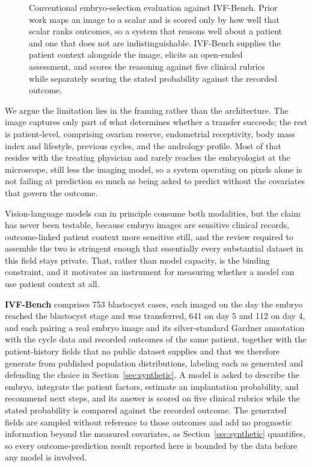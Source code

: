 \documentclass[11pt]{article}
\begin{document}
\begin{figure}[H]
\caption{Conventional embryo-selection evaluation against IVF-Bench. Prior work
maps an image to a scalar and is scored only by how well that scalar ranks
outcomes, so a system that reasons well about a patient and one that does not are
indistinguishable. IVF-Bench supplies the patient context alongside the image,
elicits an open-ended assessment, and scores the reasoning against five clinical
rubrics while separately scoring the stated probability against the recorded
outcome.}
\label{fig:pipeline}
\end{figure}


We argue the limitation lies in the framing rather than the architecture. The
image captures only part of what determines whether a transfer succeeds; the rest
is patient-level, comprising ovarian reserve, endometrial receptivity, body mass
index and lifestyle, previous cycles, and the andrology profile. Most of that
resides with the treating physician and rarely reaches the embryologist at the
microscope, still less the imaging model, so a system operating on pixels alone
is not failing at prediction so much as being asked to predict without the
covariates that govern the outcome.

Vision-language models can in principle consume both modalities, but the claim
has never been testable, because embryo images are sensitive clinical records,
outcome-linked patient context more sensitive still, and the review required to
assemble the two is stringent enough that essentially every substantial dataset
in this field stays private. That, rather than model capacity, is the binding
constraint, and it motivates an instrument for measuring whether a model can use
patient context at all.

\textbf{IVF-Bench} comprises 753 blastocyst cases, each imaged on the day the
embryo reached the blastocyst stage and was transferred, 641 on day 5 and 112 on
day 4, and each pairing a real embryo image and its silver-standard Gardner
annotation with the cycle data and recorded outcomes of the same patient, together with the patient-history fields that no
public dataset supplies and that we therefore generate from published population
distributions, labeling each as generated and defending the choice in
Section~\ref{sec:synthetic}. A model is asked to describe the embryo, integrate
the patient factors, estimate an implantation probability, and recommend next
steps, and its answer is scored on five clinical rubrics while the stated
probability is compared against the recorded outcome. The generated fields are
sampled without reference to those outcomes and add no prognostic information
beyond the measured covariates, as Section~\ref{sec:synthetic} quantifies, so
every outcome-prediction result reported here is bounded by the data before any
model is involved.
\end{document}
